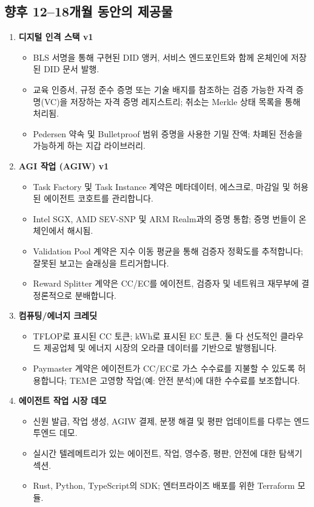 \documentclass[11pt]{article}
\begin{document}
\subsection{향후 12--18개월 동안의 제공물}
\begin{enumerate}[label=\textbf{D\arabic*.}, leftmargin=*]
  \item \textbf{디지털 인격 스택 v1}
  \begin{itemize}[noitemsep]
    \item BLS 서명을 통해 구현된 DID 앵커, 서비스 엔드포인트와 함께 온체인에 저장된 DID 문서 발행.
    \item 교육 인증서, 규정 준수 증명 또는 기술 배지를 참조하는 검증 가능한 자격 증명(VC)을 저장하는 자격 증명 레지스트리; 취소는 Merkle 상태 목록을 통해 처리됨.
    \item Pedersen 약속 및 Bulletproof 범위 증명을 사용한 기밀 잔액; 차폐된 전송을 가능하게 하는 지갑 라이브러리.
  \end{itemize}
  \item \textbf{AGI 작업 (AGIW) v1}
  \begin{itemize}[noitemsep]
    \item Task Factory 및 Task Instance 계약은 메타데이터, 에스크로, 마감일 및 허용된 에이전트 코호트를 관리합니다.
    \item Intel SGX, AMD SEV-SNP 및 ARM Realm과의 증명 통합; 증명 번들이 온체인에서 해시됨.
    \item Validation Pool 계약은 지수 이동 평균을 통해 검증자 정확도를 추적합니다; 잘못된 보고는 슬래싱을 트리거합니다.
    \item Reward Splitter 계약은 CC/EC를 에이전트, 검증자 및 네트워크 재무부에 결정론적으로 분배합니다.
  \end{itemize}
  \item \textbf{컴퓨팅/에너지 크레딧}
  \begin{itemize}[noitemsep]
    \item TFLOP로 표시된 CC 토큰; kWh로 표시된 EC 토큰. 둘 다 선도적인 클라우드 제공업체 및 에너지 시장의 오라클 데이터를 기반으로 발행됩니다.
    \item Paymaster 계약은 에이전트가 CC/EC로 가스 수수료를 지불할 수 있도록 허용합니다; TEM은 고영향 작업(예: 안전 분석)에 대한 수수료를 보조합니다.
  \end{itemize}
  \item \textbf{에이전트 작업 시장 데모}
  \begin{itemize}[noitemsep]
    \item 신원 발급, 작업 생성, AGIW 결제, 분쟁 해결 및 평판 업데이트를 다루는 엔드투엔드 데모.
    \item 실시간 텔레메트리가 있는 에이전트, 작업, 영수증, 평판, 안전에 대한 탐색기 섹션.
    \item Rust, Python, TypeScript의 SDK; 엔터프라이즈 배포를 위한 Terraform 모듈.
  \end{itemize}
\end{enumerate}
\end{document}
